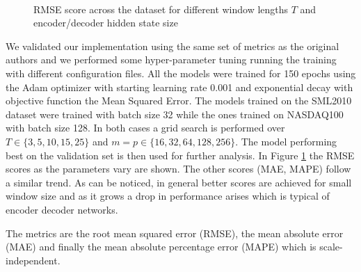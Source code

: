 \documentclass{article}
\begin{document}
\begin{figure}[h]
  \centering
   \\
  \caption{RMSE score across the dataset for different
   window lengths $T$ and encoder/decoder hidden state size}
  \label{fig:hype}
\end{figure}


We validated our implementation using the same set of metrics as the original 
authors and we performed some hyper-parameter tuning running the training with
different configuration files. All the models were trained for 150 epochs using
the Adam optimizer with starting learning rate 0.001 and exponential decay with
objective function the Mean Squared Error. The
models trained on the SML2010 dataset were trained with batch size 32 while
the ones trained on NASDAQ100 with batch size 128. In both cases a grid search
is performed over $T \in \{3, 5, 10, 15, 25\}$ and $m = p \in \{16, 32, 64, 128, 256\}$.
The model performing best on the validation set is then used for further analysis.
In Figure \ref{fig:hype} the RMSE scores as the parameters vary are shown. The
other scores (MAE, MAPE) follow a similar trend. As can be noticed, in general better
scores are achieved for small window size and as it grows a drop in performance arises
which is typical of encoder decoder networks.

The metrics are the root mean squared error (RMSE), the mean absolute error (MAE) 
and finally the mean absolute percentage error (MAPE) which is scale-independent.
\end{document}
